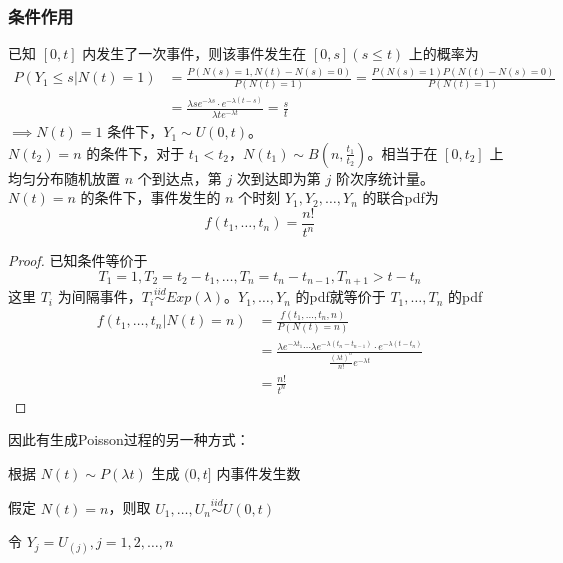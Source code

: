 \documentclass[./main.tex]{subfiles}
\begin{document}
\subsubsection{条件作用}
已知 $[0,t]$ 内发生了一次事件，则该事件发生在 $[0,s](s\le t)$ 上的概率为
\begin{align*}
    P(Y_1\le s|N(t)=1) & =\frac{P(N(s)=1,N(t)-N(s)=0)}{P(N(t)=1)}=\frac{P(N(s)=1)P(N(t)-N(s)=0)}{P(N(t)=1)} \\&=\frac{\lambda se^{-\lambda s}\cdot e^{-\lambda(t-s)}}{\lambda te^{-\lambda t}}=\frac{s}{t}
\end{align*}
$\implies N(t)=1$ 条件下，$Y_1\sim U(0,t)$。\\
$N(t_2)=n$ 的条件下，对于 $t_1<t_2$，$N(t_1)\sim B(n,\frac{t_1}{t_2})$。相当于在 $[0,t_2]$ 上均匀分布随机放置 $n$ 个到达点，第 $j$ 次到达即为第 $j$ 阶{\kaishu 次序统计量}。\\
$N(t)=n$ 的条件下，事件发生的 $n$ 个时刻 $Y_1,Y_2,\dots,Y_n$ 的联合pdf为
\begin{equation}
    f(t_1,\dots,t_n)=\frac{n!}{t^n}
\end{equation}
\begin{proof}
    已知条件等价于 $$T_1=1,T_2=t_2-t_1,\dots,T_n=t_n-t_{n-1},T_{n+1}>t-t_n$$这里 $T_i$ 为间隔事件，$T_i\mathop\sim\limits^{iid} Exp(\lambda)$。$Y_1,\dots,Y_n$ 的pdf就等价于 $T_1,\dots,T_n$ 的pdf
    \begin{align*}
        f(t_1,\dots,t_n|N(t)=n) & =\frac{f(t_1,\dots,t_n,n)}{P(N(t)=n)}                                                                                                       \\
                                & =\frac{\lambda e^{-\lambda t_1}\cdots \lambda e^{-\lambda(t_n-t_{n-1})}\cdot e^{-\lambda(t-t_n)}}{\frac{(\lambda t)^{n}}{n!}e^{-\lambda t}} \\
                                & =\frac{n!}{t^n}
    \end{align*}
\end{proof}
\noindent 因此有生成Poisson过程的另一种方式：
\begin{enumerate*}
    \item 根据 $N(t)\sim P(\lambda t)$ 生成 $(0,t]$ 内事件发生数
    \item 假定 $N(t)=n$，则取 $U_1,\dots,U_n\mathop{\sim}\limits^{iid}U(0,t)$
    \item 令 $Y_j=U_{(j)},j=1,2,\dots,n$
\end{enumerate*}
\end{document}
